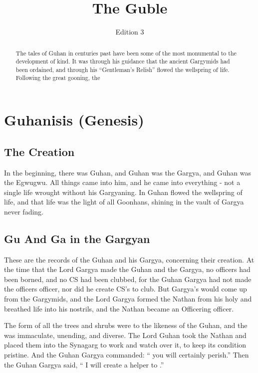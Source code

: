 \documentclass{article}
\title{The Guble}
\author{Edition 3 \\ \censor{Uncensored version}}
\begin{document}
\maketitle
\clearpage
\hypersetup{allcolors=black}
\tableofcontents
\hypersetup{allcolors=blue}  %
\clearpage
\begin{abstract}
The tales of Guhan in centuries past have been some of the most monumental to the development of  kind. It was through his guidance that the ancient Gargymids had been ordained, and through his “Gentleman's Relish” flowed the wellspring of life. Following the great gooning, the %
\end{abstract}

\section{Guhanisis (Genesis)}

\subsection{The Creation}

In the beginning, there was Guhan, and Guhan was the Gargya, and Guhan was the Egwugwu. All things came into him, and he came into everything - not a single life wrought without his Gargyaning. In Guhan flowed the wellspring of life, and that life was the light of all Goonhans, shining in the vault of Gargya never fading.

\subsection{Gu And Ga in the Gargyan}

These are the records of the Guhan and his Gargya, concerning their creation. At the time that the Lord Gargya made the Guhan and the Gargya, no officers had been borned, and no CS had been clubbed, for the Guhan Gargya had not made the officers officer, nor did he create CS's to club. But Gargya's would come up from the Gargymids, and the Lord Gargya formed the Nathan from his holy  and breathed life into his nostrils, and the Nathan became an Officering officer.  

The form of all the trees and shrubs were to the likeness of the Guhan, and the  was immaculate, unending, and diverse. The Lord Guhan took the Nathan and placed them into the Synagarg to work and watch over it, to keep its condition pristine. And the Guhan Gargya commanded: “ you will certainly perish.” Then the Guhan Gargya said, “ I will create a helper to .” 
\end{document}

